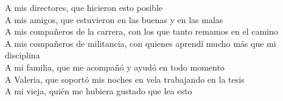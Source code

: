 \newcommand{\dedicatoria}[1]{\hfill #1\\}


\dedicatoria{A mis directores, que hicieron esto posible}

\dedicatoria{A mis amigos, que estuvieron en las buenas y en las malas}

\dedicatoria{A mis compañeros de la carrera, con los que tanto remamos en el camino}

\dedicatoria{A mis compañeros de militancia, con quienes aprendí mucho más que mi disciplina}

\dedicatoria{A mi familia, que me acompañó y ayudó en todo momento}

\dedicatoria{A Valeria, que soportó mis noches en vela trabajando en la tesis}

\dedicatoria{A mi vieja, quién me hubiera gustado que lea esto}